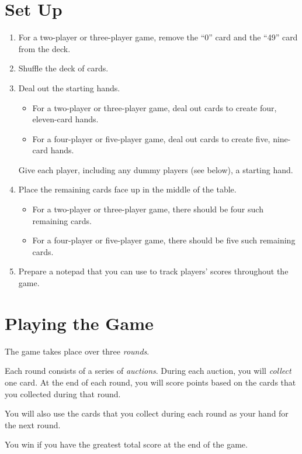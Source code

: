 \documentclass[a6paper, parskip=half, DIV=14, 10pt]{scrartcl}
\begin{document}
\section*{Set Up}
\begin{enumerate}[leftmargin=*]
	\item For a two-player or three-player game, remove the ``0'' card and the ``49'' card from the deck.
	\item Shuffle the deck of cards.
	\item Deal out the starting hands.
	\begin{itemize}[leftmargin=*]
		\item For a two-player or three-player game, deal out cards to create four, eleven-card hands.
		\item For a four-player or five-player game, deal out cards to create five, nine-card hands.
	\end{itemize}
	Give each player, including any dummy players (see below), a starting hand.
	\item Place the remaining cards face up in the middle of the table.
	\begin{itemize}[leftmargin=*]
		\item For a two-player or three-player game, there should be four such remaining cards.
		\item For a four-player or five-player game, there should be five such remaining cards.
	\end{itemize}
	\item Prepare a notepad that you can use to track players' scores throughout the game.
\end{enumerate}

\newpage

\section*{Playing the Game}
The game takes place over three \emph{rounds}.

Each round consists of a series of \emph{auctions}.
During each auction, you will \emph{collect} one card.
At the end of each round, you will score points based on the cards that you collected during that round.

You will also use the cards that you collect during each round as your hand for the next round.

You win if you have the greatest total score at the end of the game.

\vfill
\end{document}
